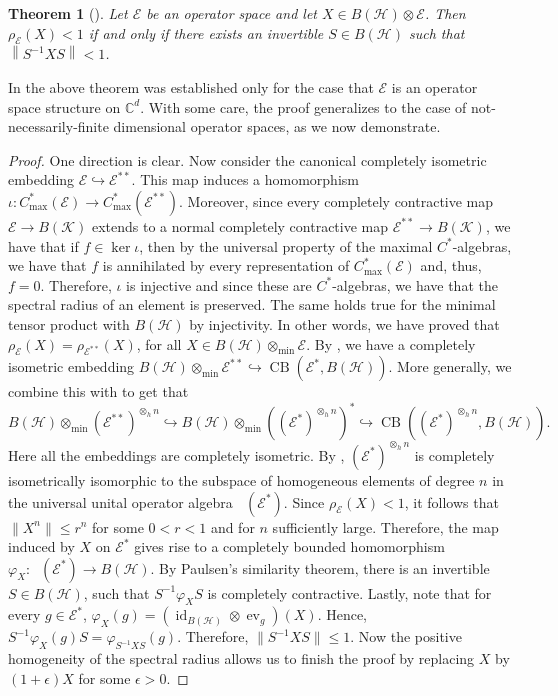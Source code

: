 \documentclass[12pt]{amsart}
\numberwithin{equation}{section}
\newtheorem{theorem}{Theorem}[section]
\theoremstyle{definition}
\newcommand{\cE}{\mathcal{E}}
\newcommand{\cH}{\mathcal{H}}
\newcommand{\cK}{\mathcal{K}}
\newcommand{\bC}{\mathbb{C}}
\newcommand{\id}{\operatorname{id}}
\DeclareMathOperator{\oa}{OA_u}
\begin{document}
\begin{theorem}[\cite{shalsham2025spectral}]\label{thm:SS25}
    Let $\cE$ be an operator space and let $X \in B(\cH) \otimes \cE$. Then $\rho_\cE(X)<1$ if and only if there exists an invertible $S \in B(\cH)$ such that $\left\| S^{-1} X S \right\| < 1$. 
\end{theorem}
In \cite{shalsham2025spectral} the above theorem was established only for the case that $\cE$ is an operator space structure on $\bC^d$. 
With some care, the proof generalizes to the case of not-necessarily-finite dimensional operator spaces, as we now demonstrate.
\begin{proof}
    One direction is clear. Now consider the canonical completely isometric embedding $\cE \hookrightarrow \cE^{**}$. This map induces a homomorphism $\iota \colon C^*_{\max}(\cE) \to C^*_{\max}(\cE^{**})$. Moreover, since every completely contractive map $\cE \to B(\cK)$ extends to a normal completely contractive map $\cE^{**} \to B(\cK)$, we have that if $f \in \ker \iota$, then by the universal property of the maximal $C^*$-algebras, we have that $f$ is annihilated by every representation of $C^*_{\max}(\cE)$ and, thus, $f =0$. Therefore, $\iota$ is injective and since these are $C^*$-algebras, we have that the spectral radius of an element is preserved. 
    The same holds true for the minimal tensor product with $B(\cH)$ by injectivity. In other words, we have proved that $\rho_{\cE}(X) = \rho_{\cE^{**}}(X)$, for all $X \in B(\cH) \otimes_{\min} \cE$. By \cite[Equation  1.35]{BlecherLeMerdy}, we have a completely isometric embedding $B(\cH) \otimes_{\min} \cE^{**} \hookrightarrow \operatorname{CB}(\cE^*, B(\cH))$. More generally, we combine this with \cite[Equation 1.43]{BlecherLeMerdy} to get that
    \[
    B(\cH) \otimes_{\min} (\cE^{**})^{\otimes_h n} \hookrightarrow B(\cH) \otimes_{\min} ((\cE^*)^{\otimes_h n})^* \hookrightarrow \operatorname{CB}((\cE^*)^{\otimes_h n}, B(\cH)).
    \]
    Here all the embeddings are completely isometric. By \cite[Proposition 6.6]{Pisier-book}, $(\cE^*)^{\otimes_h n}$ is completely isometrically isomorphic to the subspace of homogeneous elements of degree $n$ in the universal unital operator algebra $\oa(\cE^*)$. 
    Since $\rho_{\cE}(X) < 1$, it follows that $\|X^n\| \leq r^n$ for some $0 < r < 1$  and for $n$ sufficiently large. 
    Therefore, the map induced by $X$ on $\cE^*$ gives rise to a completely bounded homomorphism $\varphi_X \colon \oa(\cE^*) \to B(\cH)$. By Paulsen's similarity theorem, there is an invertible $S \in B(\cH)$, such that $S^{-1} \varphi_X S$ is completely contractive. Lastly, note that for every $g \in \cE^*$, $\varphi_X(g) = (\id_{B(\cH)} \otimes \operatorname{ev}_g)(X)$. Hence, $S^{-1} \varphi_X(g) S = \varphi_{S^{-1} X S}(g)$. Therefore, $\|S^{-1} X S\| \leq 1$. Now the positive homogeneity of the spectral radius allows us to finish the proof by replacing $X$ by $(1+\epsilon)X$ for some $\epsilon > 0$.
\end{proof}
\end{document}
